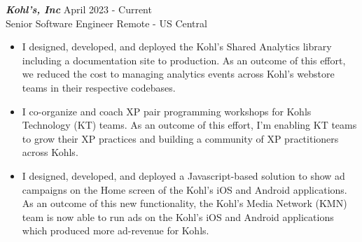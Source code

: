 {\sl \textbf{Kohl's, Inc}} \hfill April 2023 - Current \\ Senior Software Engineer \hfill Remote - US Central
\begin{itemize}
    \item I designed, developed, and deployed the Kohl's Shared Analytics library including a documentation site to production. As an outcome of this effort, we reduced the cost to managing analytics events across Kohl's webstore teams in their respective codebases.
    \item I co-organize and coach XP pair programming workshops for Kohls Technology (KT) teams. As an outcome of this effort, I'm enabling KT teams to grow their XP practices and building a community of XP practitioners across Kohls.
    \item I designed, developed, and deployed a Javascript-based solution to show ad campaigns on the Home screen of the Kohl's iOS and Android applications. As an outcome of this new functionality, the Kohl's Media Network (KMN) team is now able to run ads on the Kohl's iOS and Android applications which produced more ad-revenue for Kohls.
\end{itemize}